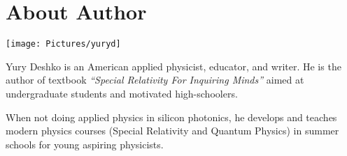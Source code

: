 \section*{About Author}

\begin{minipage}{0.3\textwidth}
\texttt{[image: Pictures/yuryd]}
\end{minipage}
\begin{minipage}{0.6\textwidth}\raggedright
Yury Deshko is an American applied physicist, educator, and writer.
He is the author of textbook \emph{``Special Relativity For Inquiring Minds''}
aimed at undergraduate students and motivated
high-schoolers.

When not doing applied physics in silicon photonics,
he develops and teaches modern physics courses (Special Relativity and
Quantum Physics) in summer schools for young aspiring physicists.
\end{minipage}
\noindent
\\
